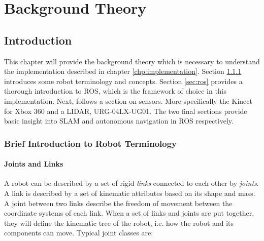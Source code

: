 \chapter{Background Theory}
\label{chp:theory} 

\section{Introduction}

This chapter will provide the background theory which is necessary to understand the implementation described in chapter \ref{chp:implementation}. Section \ref{sec:terminology} introduces some robot terminology and concepts. Section \ref{sec:ros} provides a thorough introduction to \ac{ROS}, which is the framework of choice in this implementation. Next, follows a section on sensors. More specifically the Kinect for Xbox 360 and a \ac{LIDAR}, URG-04LX-UG01. The two final sections provide basic insight into \ac{SLAM} and autonomous navigation in \ac{ROS} respectively. 

\subsection{Brief Introduction to Robot Terminology}
\label{sec:terminology}

\subsubsection{Joints and Links}

A robot can be described by a set of rigid \textit{links} connected to each other by \textit{joints}. A link is described by a set of kinematic attributes based on its shape and mass. A joint between two links describe the freedom of movement between the coordinate systems of each link. When a set of links and joints are put together, they will define the kinematic tree of the robot, i.e. how the robot and its components can move. Typical joint classes are:


